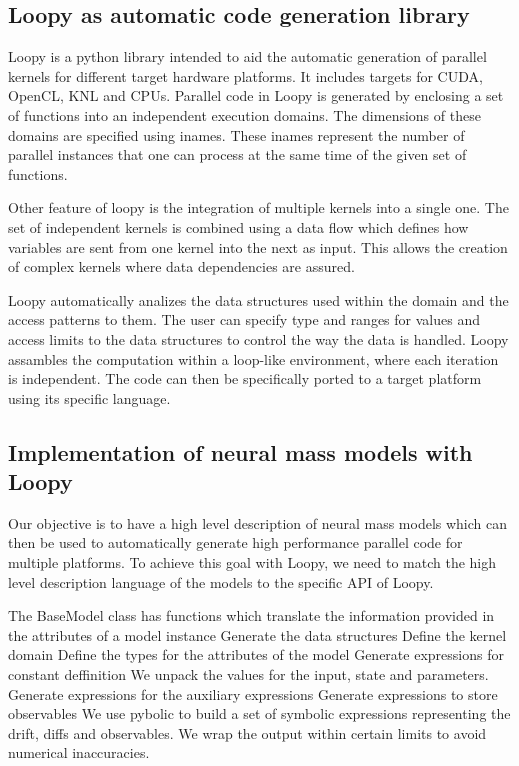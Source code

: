 \documentclass[a4paper,10pt]{article}
\begin{document}
\subsection{Loopy as automatic code generation library}
Loopy \cite{loopy2014} is a python library intended to aid the automatic generation of parallel kernels for different target hardware platforms.
It includes targets for CUDA, OpenCL, KNL and CPUs.
Parallel code in Loopy is generated by enclosing a set of functions into an independent execution domains.
The dimensions of these domains are specified using inames. 
These inames represent the number of parallel instances that one can process at the same time of the given set of functions.

Other feature of loopy is the integration of multiple kernels into a single one.
The set of independent kernels is combined using a data flow which defines how variables are sent from one kernel into the next as input.
This allows the creation of complex kernels where data dependencies are assured.

Loopy automatically analizes the data structures used within the domain and the access patterns to them. 
The user can specify type and ranges for values and access limits to the data structures to control the way the data is handled.
Loopy assambles the computation within a loop-like environment, where each iteration is independent.
The code can then be specifically ported to a target platform using its specific language.

\subsection{Implementation of neural mass models with Loopy}
Our objective is to have a high level description of neural mass models which can then be used to automatically generate high performance parallel code for multiple platforms.
To achieve this goal with Loopy, we need to match the high level description language of the models to the specific API of Loopy.

The BaseModel class has functions which translate the information provided in the attributes of a model instance 
Generate the data structures
Define the kernel domain
Define the types for the attributes of the model
Generate expressions for constant deffinition
We unpack the values for the input, state and parameters.
Generate expressions for the auxiliary expressions
Generate expressions to store observables
We use pybolic to build a set of symbolic expressions representing the drift, diffs and observables.
We wrap the output within certain limits to avoid numerical inaccuracies. 



\end{document}
